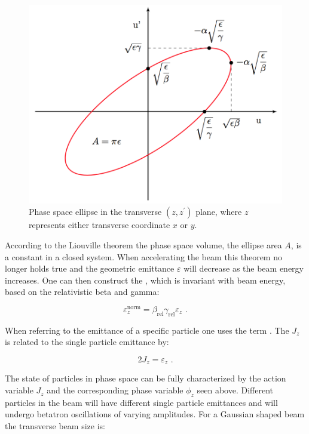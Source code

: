 \begin{figure}[!htb]
    \begin{center}
    \includegraphics[width = 0.75\linewidth]{Figures/Beam_Dynamics_Theory/phase_space.png}
    \caption{Phase space ellipse in the transverse \((z, z^{\prime})\) plane, where \(z\) represents either transverse coordinate \(x\) or \(y\).}
    \label{figure:phase_space_ellipse}
    \end{center}
\end{figure}

According to the Liouville theorem the phase space volume, the ellipse area \(A\), is a constant in a closed system.
When accelerating the beam this theorem no longer holds true and the geometric emittance \(\varepsilon\) will decrease as the beam energy increases.
One can then construct the , which is invariant with beam energy, based on the relativistic beta and gamma:

\begin{equation}
    \varepsilon_z^{\mathrm{norm}} = \beta_{\mathrm{rel}} \gamma_{\mathrm{rel}} \varepsilon_z \text{ .}
    \label{equation:normalized_emittance}
\end{equation}

When referring to the emittance of a specific particle one uses the term .
The  \(J_z\) is related to the single particle emittance by:

\begin{equation}
    2 J_z = \varepsilon_z \text{ .}
    \label{equation:single_particle_action}
\end{equation}

The state of particles in phase space can be fully characterized by the action variable \(J_z\) and the corresponding phase variable \(\phi_z\) seen above. 
Different particles in the beam will have different single particle emittances and will undergo betatron oscillations of varying amplitudes.
For a Gaussian shaped beam the transverse beam size is:

